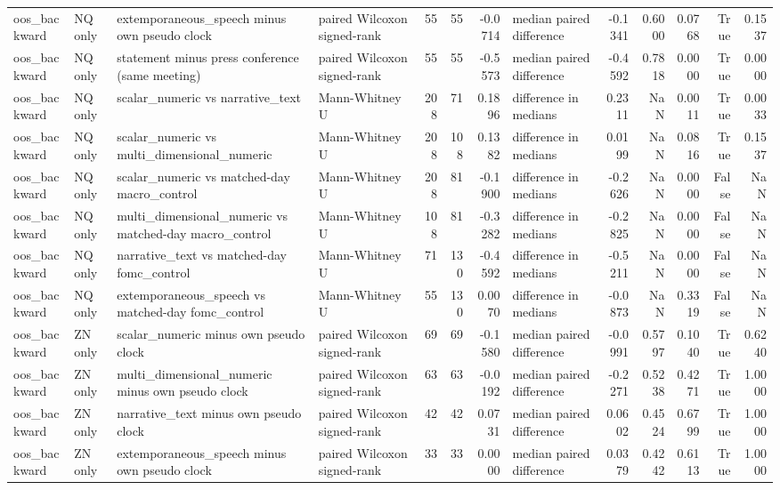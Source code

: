 \begin{tabular}{llllrrrlrrrrr}
oos_backward & NQ only & extemporaneous_speech minus own pseudo clock & paired Wilcoxon signed-rank & 55 & 55 & -0.0714 & median paired difference & -0.1341 & 0.6000 & 0.0768 & True & 0.1537 \\
oos_backward & NQ only & statement minus press conference (same meeting) & paired Wilcoxon signed-rank & 55 & 55 & -0.5573 & median paired difference & -0.4592 & 0.7818 & 0.0000 & True & 0.0000 \\
oos_backward & NQ only & scalar_numeric vs narrative_text & Mann-Whitney U & 208 & 71 & 0.1896 & difference in medians & 0.2311 & NaN & 0.0011 & True & 0.0033 \\
oos_backward & NQ only & scalar_numeric vs multi_dimensional_numeric & Mann-Whitney U & 208 & 108 & 0.1382 & difference in medians & 0.0199 & NaN & 0.0816 & True & 0.1537 \\
oos_backward & NQ only & scalar_numeric vs matched-day macro_control & Mann-Whitney U & 208 & 81 & -0.1900 & difference in medians & -0.2626 & NaN & 0.0000 & False & NaN \\
oos_backward & NQ only & multi_dimensional_numeric vs matched-day macro_control & Mann-Whitney U & 108 & 81 & -0.3282 & difference in medians & -0.2825 & NaN & 0.0000 & False & NaN \\
oos_backward & NQ only & narrative_text vs matched-day fomc_control & Mann-Whitney U & 71 & 130 & -0.4592 & difference in medians & -0.5211 & NaN & 0.0000 & False & NaN \\
oos_backward & NQ only & extemporaneous_speech vs matched-day fomc_control & Mann-Whitney U & 55 & 130 & 0.0070 & difference in medians & -0.0873 & NaN & 0.3319 & False & NaN \\
oos_backward & ZN only & scalar_numeric minus own pseudo clock & paired Wilcoxon signed-rank & 69 & 69 & -0.1580 & median paired difference & -0.0991 & 0.5797 & 0.1040 & True & 0.6240 \\
oos_backward & ZN only & multi_dimensional_numeric minus own pseudo clock & paired Wilcoxon signed-rank & 63 & 63 & -0.0192 & median paired difference & -0.2271 & 0.5238 & 0.4271 & True & 1.0000 \\
oos_backward & ZN only & narrative_text minus own pseudo clock & paired Wilcoxon signed-rank & 42 & 42 & 0.0731 & median paired difference & 0.0602 & 0.4524 & 0.6799 & True & 1.0000 \\
oos_backward & ZN only & extemporaneous_speech minus own pseudo clock & paired Wilcoxon signed-rank & 33 & 33 & 0.0000 & median paired difference & 0.0379 & 0.4242 & 0.6113 & True & 1.0000 \\

\end{tabular}
